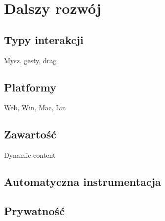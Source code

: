 \section{Dalszy rozwój}
\subsection{Typy interakcji}
Mysz, gesty, drag

\subsection{Platformy}
Web, Win, Mac, Lin 

\subsection{Zawartość}
Dynamic content

\subsection{Automatyczna instrumentacja}

\subsection{Prywatność}
